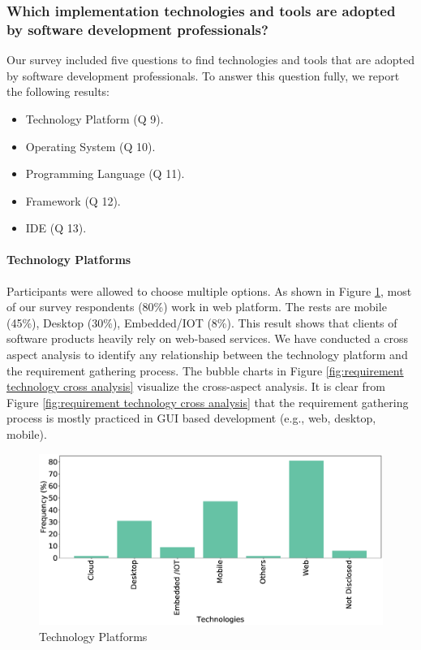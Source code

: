 \subsubsection{Which implementation technologies and tools are adopted by software development professionals?}
\label{tools}

Our survey included five questions to find technologies and tools that are adopted by software development professionals. To answer this question fully, we report the following results:

\begin{itemize}
\item Technology Platform (Q 9).
\item Operating System (Q 10).
\item Programming Language (Q 11).
\item Framework (Q 12).
\item IDE (Q 13).
\end{itemize}


\paragraph{Technology Platforms}
Participants were allowed to choose multiple options. As shown in Figure \ref{fig:platforms}, most of our survey respondents (80\%) work in web platform. The rests are mobile (45\%), Desktop (30\%), Embedded/IOT (8\%). This result shows that clients of software products heavily rely on web-based services. We have conducted a cross aspect analysis to identify any relationship between the technology platform and the requirement gathering process. The bubble charts in Figure \ref{fig:requirement technology cross analysis} visualize the cross-aspect analysis. It is clear from Figure \ref{fig:requirement technology cross analysis} that the requirement gathering process is mostly practiced in GUI based development (e.g., web, desktop, mobile).

\begin{figure}[h]
\centering
  \includegraphics[scale=0.18]{Figures/Respondents_Technologies}
  \caption{Technology Platforms}
  \label{fig:platforms}
\end{figure}

